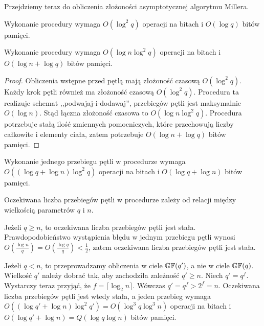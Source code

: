 \noindent
Przejdziemy teraz do obliczenia złożoności asymptotycznej algorytmu Millera.

\begin{fact}
Wykonanie procedury 
wymaga $O(\log^2 q)$ operacji na bitach i $O(\log q)$ bitów pamięci.
\end{fact}

\begin{theorem}
Wykonanie procedury 
wymaga $O(\log n \log^2 q)$ operacji na bitach
i $O(\log n + \log q)$ bitów pamięci.
\end{theorem}

\begin{proof}
Obliczenia wstępne przed pętlą 
mają złożoność czasową $O(\log^2 q)$.
Każdy krok pętli  również ma złożoność czasową $O(\log^2 q)$.
Procedura ta realizuje schemat ,,podwajaj-i-dodawaj'',
przebiegów pętli jest maksymalnie $O(\log n)$.
Stąd łączna złożoność czasowa to $O(\log n \log^2 q)$.
Procedura potrzebuje stałą ilość zmiennych pomocniczych,
które przechowują liczby całkowite i elementy ciała,
zatem potrzebuje $O(\log n + \log q)$ bitów pamięci.
\end{proof}

\begin{corollary}
Wykonanie jednego przebiegu pętli w procedurze 
wymaga $O((\log q + \log n) \log^2 q)$ operacji na bitach
i $O(\log q + \log n)$ bitów pamięci.
\end{corollary}

\begin{remark}
Oczekiwana liczba przebiegów pętli w procedurze 
zależy od relacji między wielkością parametrów $q$ i $n$.

\noindent
Jeżeli $q \geq n$, to oczekiwana liczba przebiegów pętli jest stała.
Prawdopodobieństwo wystąpienia błędu w jednym przebiegu pętli wynosi
$O(\frac{\log n}{q}) = O(\frac{\log q}{q}) < \frac{1}{2}$,
zatem oczekiwana liczba przebiegów pętli jest stała.

\noindent
Jeżeli $q < n$, to przeprowadzamy obliczenia w ciele $\mathbb{GF}(q')$,
a nie w ciele $\mathbb{GF}(q)$.
Wielkość $q'$ należy dobrać tak, aby zachodziła zależność $q' \geq n$.
Niech $q' = q^f$.
Wystarczy teraz przyjąć, że $f = \lceil\log_2 n\rceil$.
Wówczas $q' = q^f > 2^f = n$.
Oczekiwana liczba przebiegów pętli jest wtedy stała,
a jeden przebieg wymaga
$O((\log q' + \log n)\log^2 q') = O(\log^3 q \log^3 n)$ operacji na bitach
i $O(\log q' + \log n) = Q(\log q \log n)$ bitów pamięci.
\end{remark}
